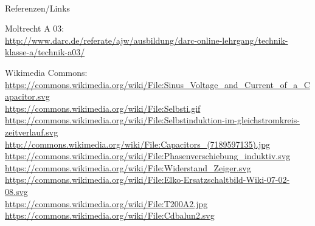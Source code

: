 \renewcommand{\refname}{Referenzen}

\hypertarget{refs}{}
\textcolor{white}{} \\ %
\Large Referenzen/Links
\footnotesize

\begin{thebibliography}{}
   Moltrecht A 03: \\
    \url{http://www.darc.de/referate/ajw/ausbildung/darc-online-lehrgang/technik-klasse-a/technik-a03/}

      Wikimedia Commons: \\
    \url{https://commons.wikimedia.org/wiki/File:Sinus_Voltage_and_Current_of_a_Capacitor.svg}\\
    \url{https://commons.wikimedia.org/wiki/File:Selbsti.gif}\\
    \url{https://commons.wikimedia.org/wiki/File:Selbstinduktion-im-gleichstromkreis-zeitverlauf.svg}\\
    \url{http://commons.wikimedia.org/wiki/File:Capacitors_(7189597135).jpg}\\
    \url{https://commons.wikimedia.org/wiki/File:Phasenverschiebung_induktiv.svg}\\
    \url{https://commons.wikimedia.org/wiki/File:Widerstand_Zeiger.svg}\\
    \url{https://commons.wikimedia.org/wiki/File:Elko-Ersatzschaltbild-Wiki-07-02-08.svg}\\
    \url{https://commons.wikimedia.org/wiki/File:T200A2.jpg}\\
    \url{https://commons.wikimedia.org/wiki/File:Cdbalun2.svg}\\
\end{thebibliography}


